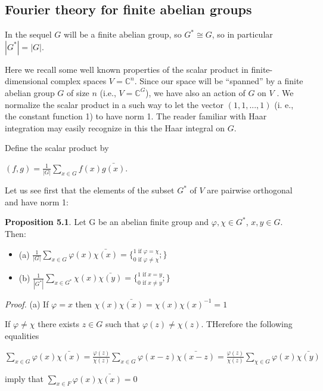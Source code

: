 \documentclass[12pt]{article}
\begin{document}
\subsection{Fourier theory for finite abelian groups}
In the sequel $G$ will be a finite abelian group, so $G^* \cong G$, so in particular $|G^*| = |G|$.


    Here we recall some well known properties of the scalar product in finite-dimensional complex spaces $V = \mathbb{C}^n$. 
Since our space will be “spanned” by a finite abelian group $G$ of size $n$ (i.e., $V = \mathbb{C}^G$), we have also an action
of $G$ on $V$ . We normalize the scalar product in a such way to let the vector $(1, 1, . . . , 1)$ (i. e., the constant
function 1) to have norm 1. The reader familiar with Haar integration may easily recognize in this the Haar
integral on $G$.


    Define the scalar product by


        $(f, g) = \frac{1}{|G|} \sum_{x \in G} f(x) \bar{g(x)}$.


Let us see first that the elements of the subset $G^*$ of $V$ are pairwise orthogonal and have norm 1:


\textbf{Proposition 5.1}. Let G be an abelian finite group and $\varphi, \chi \in G^*$, $x, y \in G$. Then:

    \begin{itemize}
 
        \item (a) $\frac{1}{|G|} \sum_{x \in G} \varphi(x) \bar{\chi(x)} = \{^{1 \text{ if } \varphi = \chi}_{0 \text{ if } \varphi \neq \chi};\}$

        \item (b) $\frac{1}{|G^*|} \sum_{x \in G^*} \chi(x) \bar{\chi(y)} = \{^{1 \text{ if } x = y}_{0 \text{ if } x \neq y};\}$

    \end{itemize}


\emph{Proof.} (a) If $\varphi = x$ then $\chi(x) \bar{\chi(x)} = \chi(x) \chi(x)^{-1} = 1$

    
    If $\varphi \neq \chi$ there exists $z \in G$ such that $\varphi(z) \neq \chi(z)$. THerefore the following equalities


    $\sum_{x \in G} \varphi(x) \bar{\chi(x)} = \frac{\varphi(z)}{\chi(z)} \sum_{x \in G} \varphi(x-z) \bar{\chi(x-z)} = \frac{\varphi(z)}{\chi(z)} \sum_{\chi \in G} \varphi(x) \bar{\chi(y)}$


imply that $\sum_{x \in F} \varphi(x)\bar{\chi(x)} = 0$
\end{document}

